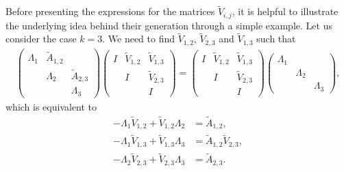 \documentclass[superscriptaddress,onecolumn,nofootinbib,longbibliography,a4paper,accepted=2026-09-29]{quantumarticle}
\theoremstyle{plain}
\theoremstyle{definition}
\numberwithin{thm}{section}
\numberwithin{assumption}{section}
\numberwithin{lemma}{section}
\numberwithin{prop}{section}
\numberwithin{cor}{section}
\numberwithin{definition}{section}
\numberwithin{rmk}{section}
\numberwithin{equation}{section}
\begin{document}
Before presenting the expressions for the matrices $\tilde{V}_{i,j}$, it is helpful to illustrate the underlying idea behind their generation through a simple example. Let us consider the case $k=3$. We need to find $\tilde{V}_{1,2}$, $\tilde{V}_{2,3}$ and $\tilde{V}_{1,3}$ such that
\begin{align}
        \begin{pmatrix}
        \Lambda_1  & \tilde{A}_{1,2}   &    \\
                 & \Lambda_2   &  \tilde{A}_{2,3}  \\
                 &           & \Lambda_3  
                 \end{pmatrix}
        \begin{pmatrix}
        I  & \tilde{V}_{1,2}   &  \tilde{V}_{1,3}  \\
                 & I   &  \tilde{V}_{2,3}  \\
                 &           &  I  
                 \end{pmatrix}
                 =\begin{pmatrix}
        I  & \tilde{V}_{1,2}   &  \tilde{V}_{1,3}  \\
                 & I   &  \tilde{V}_{2,3}  \\
                 &           &  I  
                 \end{pmatrix}
                 \begin{pmatrix}
        \Lambda_1  &     &    \\
                 & \Lambda_2   &    \\
                 &           & \Lambda_3  
                 \end{pmatrix},
\end{align}                 
which is equivalent to
\begin{align}
    -\Lambda_1 \tilde{V}_{1,2} + \tilde{V}_{1,2} \Lambda_2 &= \tilde{A}_{1,2}, \label{eq:diag_ex_1}\\    
    -\Lambda_1 \tilde{V}_{1,3} + \tilde{V}_{1,3} \Lambda_3 &= \tilde{A}_{1,2}\tilde{V}_{2,3},\label{eq:diag_ex_2}\\
    -\Lambda_2 \tilde{V}_{2,3} + \tilde{V}_{2,3} \Lambda_3 &= \tilde{A}_{2,3}.\label{eq:diag_ex_3}
\end{align}
\end{document}
